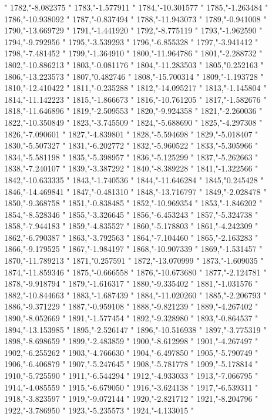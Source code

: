 "
1782,"-8.082375
"
1783,"-1.577911
"
1784,"-10.301577
"
1785,"-1.263484
"
1786,"-10.938092
"
1787,"-0.837494
"
1788,"-11.943073
"
1789,"-0.941008
"
1790,"-13.669729
"
1791,"-1.441920
"
1792,"-8.775119
"
1793,"-1.962590
"
1794,"-9.792956
"
1795,"-3.539293
"
1796,"-6.855328
"
1797,"-3.941412
"
1798,"-7.481452
"
1799,"-1.364910
"
1800,"-11.964786
"
1801,"-2.288732
"
1802,"-10.886213
"
1803,"-0.081176
"
1804,"-11.283503
"
1805,"0.252163
"
1806,"-13.223573
"
1807,"0.482746
"
1808,"-15.700314
"
1809,"-1.193728
"
1810,"-12.410422
"
1811,"-0.235288
"
1812,"-14.095217
"
1813,"-1.145804
"
1814,"-11.142223
"
1815,"-1.866673
"
1816,"-10.761205
"
1817,"-1.582676
"
1818,"-11.646896
"
1819,"-2.509553
"
1820,"-9.924358
"
1821,"-2.260036
"
1822,"-10.350849
"
1823,"-3.745509
"
1824,"-5.688690
"
1825,"-4.297308
"
1826,"-7.090601
"
1827,"-4.839801
"
1828,"-5.594698
"
1829,"-5.018407
"
1830,"-5.507327
"
1831,"-6.202772
"
1832,"-5.960522
"
1833,"-5.305966
"
1834,"-5.581198
"
1835,"-5.398957
"
1836,"-5.125299
"
1837,"-5.262663
"
1838,"-7.240107
"
1839,"-3.387292
"
1840,"-8.389228
"
1841,"-1.322566
"
1842,"-10.633335
"
1843,"-1.740536
"
1844,"-11.646284
"
1845,"0.245428
"
1846,"-14.469841
"
1847,"-0.481310
"
1848,"-13.716797
"
1849,"-2.028478
"
1850,"-9.368758
"
1851,"-0.838485
"
1852,"-10.969354
"
1853,"-1.846202
"
1854,"-8.528346
"
1855,"-3.326645
"
1856,"-6.453243
"
1857,"-5.324738
"
1858,"-7.944183
"
1859,"-4.835527
"
1860,"-5.178803
"
1861,"-4.242309
"
1862,"-6.790387
"
1863,"-3.792563
"
1864,"-7.104460
"
1865,"-2.163283
"
1866,"-9.179525
"
1867,"-1.984197
"
1868,"-10.907339
"
1869,"-1.531457
"
1870,"-11.789213
"
1871,"0.257591
"
1872,"-13.070999
"
1873,"-1.609035
"
1874,"-11.859346
"
1875,"-0.666558
"
1876,"-10.673680
"
1877,"-2.124781
"
1878,"-9.918794
"
1879,"-1.616317
"
1880,"-9.335402
"
1881,"-1.031576
"
1882,"-10.844663
"
1883,"-1.687439
"
1884,"-11.020260
"
1885,"-2.206793
"
1886,"-9.371229
"
1887,"-0.959108
"
1888,"-9.821239
"
1889,"-4.267402
"
1890,"-8.052669
"
1891,"-1.577454
"
1892,"-9.328980
"
1893,"-0.864537
"
1894,"-13.153985
"
1895,"-2.526147
"
1896,"-10.516938
"
1897,"-3.775319
"
1898,"-8.698659
"
1899,"-2.483859
"
1900,"-8.612998
"
1901,"-4.267497
"
1902,"-6.255262
"
1903,"-4.766630
"
1904,"-6.497850
"
1905,"-5.790749
"
1906,"-6.406879
"
1907,"-5.247645
"
1908,"-5.781778
"
1909,"-5.178814
"
1910,"-5.725590
"
1911,"-6.544294
"
1912,"-4.933033
"
1913,"-7.066795
"
1914,"-4.085559
"
1915,"-6.679050
"
1916,"-3.624138
"
1917,"-6.539311
"
1918,"-3.823597
"
1919,"-9.072144
"
1920,"-2.821712
"
1921,"-8.204796
"
1922,"-3.786950
"
1923,"-5.235573
"
1924,"-4.133015
"
